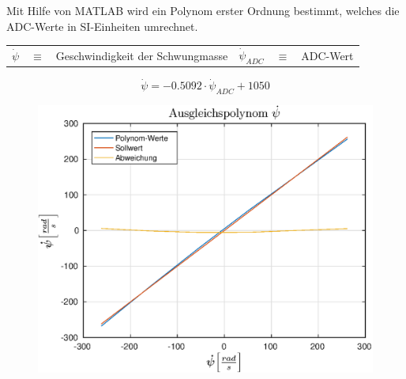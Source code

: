 Mit Hilfe von MATLAB  wird ein Polynom erster Ordnung bestimmt, welches die ADC-Werte in SI-Einheiten umrechnet.

\begin{table}[h!]
\centering
\begin{tabular}{lcllcl}
$\dot{\psi}$ & $\equiv$ & Geschwindigkeit der Schwungmasse & $\dot{\psi}_{ADC}$ & $\equiv$ & ADC-Wert
\end{tabular}
\end{table}

\begin{equation}
\dot{\psi} = -0.5092 \cdot \dot{\psi}_{ADC} + 1050
\end{equation}

\begin{figure}[h!]
\centering
	\includegraphics[width=0.5\linewidth]{img/ADC_mittelwert_polynom.eps}
\end{figure}